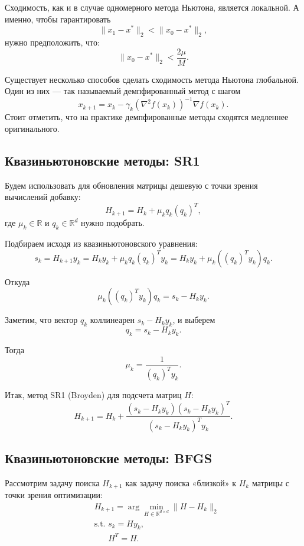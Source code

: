 \begin{note}
    Сходимость, как и в случае одномерного метода Ньютона, является локальной. А именно, чтобы гарантировать
    $$ \|x_1 - x^*\|_2 < \|x_0 - x^*\|_2, $$
    нужно предположить, что:
    $$ \|x_0 - x^*\|_2 < \frac{2\mu}{M}. $$
\end{note}

\begin{note}
    Существует несколько способов сделать сходимость метода Ньютона глобальной. Один из них — так называемый
    демпфированный метод с шагом
    $$ x_{k+1} = x_k - \gamma_k \left( \nabla^2 f(x_k) \right)^{-1} \nabla f(x_k). $$
    Стоит отметить, что на практике демпфированные методы сходятся
    медленнее оригинального.
\end{note}

\subsection*{Квазиньютоновские методы: SR1}

Будем использовать для обновления матрицы дешевую с точки зрения вычислений добавку:
$$ H_{k+1} = H_k + \mu_k q_k (q_k)^T, $$
где $\mu_k \in \mathbb{R}$ и $q_k \in \mathbb{R}^d$ нужно подобрать.

Подбираем исходя из квазиньютоновского уравнения:
$$ s_k = H_{k+1} y_k = H_k y_k + \mu_k q_k (q_k)^T y_k = H_k y_k + \mu_k \left( (q_k)^T y_k \right) q_k. $$

Откуда
$$ \mu_k \left( (q_k)^T y_k \right) q_k = s_k - H_k y_k. $$

Заметим, что вектор $q_k$ коллинеарен $s_k - H_k y_k$, и выберем
$$ q_k = s_k - H_k y_k. $$

Тогда
$$ \mu_k = \frac{1}{(q_k)^T y_k}. $$

Итак, метод SR1 (Broyden) для подсчета матриц $H$:
$$ H_{k+1} = H_k + \frac{(s_k - H_k y_k)(s_k - H_k y_k)^T}{(s_k - H_k y_k)^T y_k}. $$

\subsection*{Квазиньютоновские методы: BFGS}

Рассмотрим задачу поиска $H_{k+1}$ как задачу поиска «близкой» к $H_k$ матрицы с точки зрения оптимизации:
\begin{equation}
    \begin{aligned}
        & H_{k+1} = \arg \min_{H \in \mathbb{R}^{d \times d}} \| H - H_k \|_2 \\
        & \text{s.t. } s_k = H y_k, \\
        & \phantom{\text{s.t. }} H^T = H.
    \end{aligned}
\end{equation}

